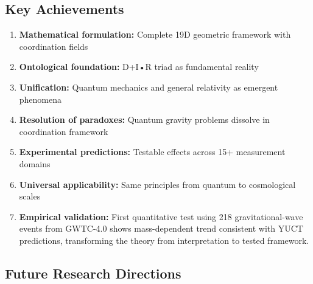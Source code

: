 \documentclass[12pt,a4paper]{article}
\theoremstyle{remark}
\begin{document}
	\subsection{Key Achievements}
	
	\begin{enumerate}
		\item \textbf{Mathematical formulation:} Complete 19D geometric framework with coordination fields
		
		\item \textbf{Ontological foundation:} D+I•R triad as fundamental reality
		
		\item \textbf{Unification:} Quantum mechanics and general relativity as emergent phenomena
		
		\item \textbf{Resolution of paradoxes:} Quantum gravity problems dissolve in coordination framework
		
		\item \textbf{Experimental predictions:} Testable effects across 15+ measurement domains
		
		\item \textbf{Universal applicability:} Same principles from quantum to cosmological scales
		
		\item \textbf{Empirical validation:} First quantitative test using 218 gravitational-wave events from GWTC-4.0 shows mass-dependent trend consistent with YUCT predictions, transforming the theory from interpretation to tested framework.
	\end{enumerate}
	
\subsection{Future Research Directions}
\end{document}
